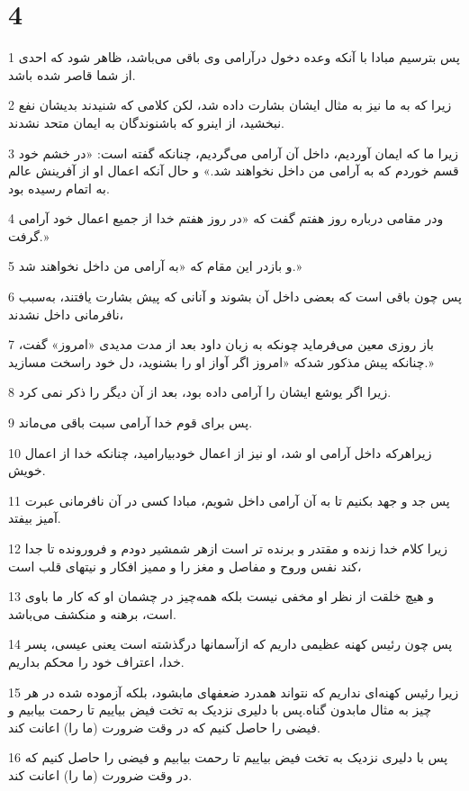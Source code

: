 \chapter{4}

\par 1 پس بترسیم مبادا با آنکه وعده دخول درآرامی وی باقی می‌باشد، ظاهر شود که احدی از شما قاصر شده باشد.
\par 2 زیرا که به ما نیز به مثال ایشان بشارت داده شد، لکن کلامی که شنیدند بدیشان نفع نبخشید، از اینرو که باشنوندگان به ایمان متحد نشدند.
\par 3 زیرا ما که ایمان آوردیم، داخل آن آرامی می‌گردیم، چنانکه گفته است: «در خشم خود قسم خوردم که به آرامی من داخل نخواهند شد.» و حال آنکه اعمال او از آفرینش عالم به اتمام رسیده بود.
\par 4 ودر مقامی درباره روز هفتم گفت که «در روز هفتم خدا از جمیع اعمال خود آرامی گرفت.»
\par 5 و بازدر این مقام که «به آرامی من داخل نخواهند شد.»
\par 6 پس چون باقی است که بعضی داخل آن بشوند و آنانی که پیش بشارت یافتند، به‌سبب نافرمانی داخل نشدند،
\par 7 باز روزی معین می‌فرماید چونکه به زبان داود بعد از مدت مدیدی «امروز» گفت، چنانکه پیش مذکور شدکه «امروز اگر آواز او را بشنوید، دل خود راسخت مسازید.»
\par 8 زیرا اگر یوشع ایشان را آرامی داده بود، بعد از آن دیگر را ذکر نمی کرد.
\par 9 پس برای قوم خدا آرامی سبت باقی می‌ماند.
\par 10 زیراهر‌که داخل آرامی او شد، او نیز از اعمال خودبیارامید، چنانکه خدا از اعمال خویش.
\par 11 پس جد و جهد بکنیم تا به آن آرامی داخل شویم، مبادا کسی در آن نافرمانی عبرت آمیز بیفتد.
\par 12 زیرا کلام خدا زنده و مقتدر و برنده تر است ازهر شمشیر دودم و فرورونده تا جدا کند نفس وروح و مفاصل و مغز را و ممیز افکار و نیتهای قلب است،
\par 13 و هیچ خلقت از نظر او مخفی نیست بلکه همه‌چیز در چشمان او که کار ما باوی است، برهنه و منکشف می‌باشد.
\par 14 پس چون رئیس کهنه عظیمی داریم که ازآسمانها درگذشته است یعنی عیسی، پسر خدا، اعتراف خود را محکم بداریم.
\par 15 زیرا رئیس کهنه‌ای نداریم که نتواند همدرد ضعفهای مابشود، بلکه آزموده شده در هر چیز به مثال مابدون گناه.پس با دلیری نزدیک به تخت فیض بیاییم تا رحمت بیابیم و فیضی را حاصل کنیم که در وقت ضرورت (ما را) اعانت کند.
\par 16 پس با دلیری نزدیک به تخت فیض بیاییم تا رحمت بیابیم و فیضی را حاصل کنیم که در وقت ضرورت (ما را) اعانت کند.

